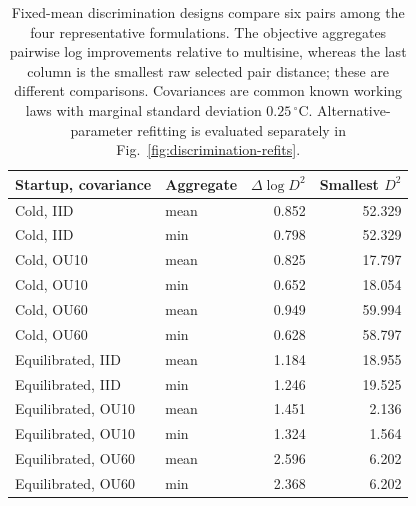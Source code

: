 \begin{table}[tbp]
\centering\small
\begin{tabular}{llrr}
\toprule
Startup, covariance & Aggregate & $\Delta\log D^2$ & Smallest $D^2$ \\
\midrule
Cold, IID & mean & 0.852 & 52.329 \\
Cold, IID & min & 0.798 & 52.329 \\
Cold, OU10 & mean & 0.825 & 17.797 \\
Cold, OU10 & min & 0.652 & 18.054 \\
Cold, OU60 & mean & 0.949 & 59.994 \\
Cold, OU60 & min & 0.628 & 58.797 \\
Equilibrated, IID & mean & 1.184 & 18.955 \\
Equilibrated, IID & min & 1.246 & 19.525 \\
Equilibrated, OU10 & mean & 1.451 & 2.136 \\
Equilibrated, OU10 & min & 1.324 & 1.564 \\
Equilibrated, OU60 & mean & 2.596 & 6.202 \\
Equilibrated, OU60 & min & 2.368 & 6.202 \\
\bottomrule
\end{tabular}
\caption{Fixed-mean discrimination designs compare six pairs among the four representative formulations. The objective aggregates pairwise log improvements relative to multisine, whereas the last column is the smallest raw selected pair distance; these are different comparisons. Covariances are common known working laws with marginal standard deviation $0.25\,{}^\circ\mathrm C$. Alternative-parameter refitting is evaluated separately in Fig.~\ref{fig:discrimination-refits}.}
\label{tab:discrimination-design}
\end{table}
